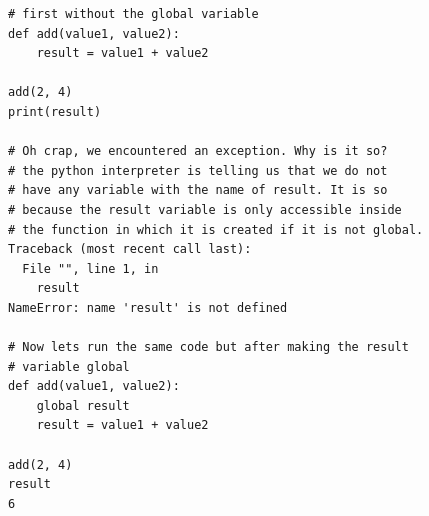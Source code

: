 \documentclass{report}
\begin{document}
    \begin{verbatim}
# first without the global variable
def add(value1, value2):
    result = value1 + value2

add(2, 4)
print(result)

# Oh crap, we encountered an exception. Why is it so?
# the python interpreter is telling us that we do not
# have any variable with the name of result. It is so
# because the result variable is only accessible inside
# the function in which it is created if it is not global.
Traceback (most recent call last):
  File "", line 1, in
    result
NameError: name 'result' is not defined

# Now lets run the same code but after making the result
# variable global
def add(value1, value2):
    global result
    result = value1 + value2

add(2, 4)
result
6
    \end{verbatim}
    \bigbreak \noindent 
    \bigbreak \noindent 
\end{document}
